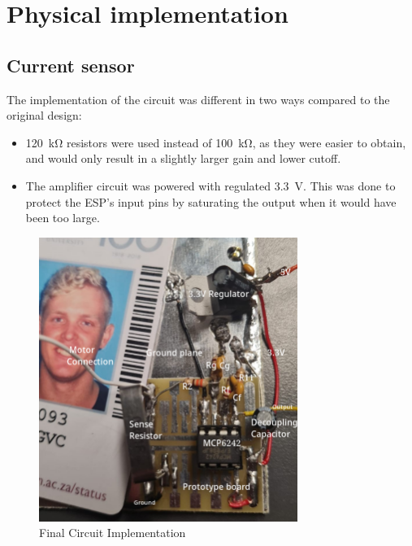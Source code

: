 \chapter{Physical implementation}\label{ch:implementation}

\section{Current sensor}\label{sec:current_sensor_physical}

The implementation of the circuit was different in two ways compared to the original design:
\begin{itemize}
   \item \SI{120}{\kilo\ohm} resistors were used instead of \SI{100}{\kilo\ohm}, as they were easier to obtain, and would only result in a
         slightly larger gain and lower cutoff.
   \item The amplifier circuit was powered with regulated \SI{3.3}{V}. This was done to protect the ESP's input pins by saturating the output
         when it would have been too large.
\end{itemize}

\begin{figure}[!htb]
  \centering
  \includegraphics[width=0.75\textwidth]{Figures/physical_circuit}
  \caption{Final Circuit Implementation}
\end{figure}